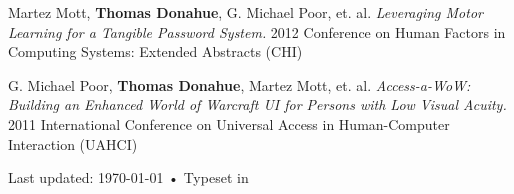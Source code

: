\documentclass[10pt, letter]{article}
\newcommand{\years}[1]{\marginnote{\footnotesize #1}}
\begin{document}
\vspace{.2cm}
\years{2012} 
Martez Mott, \textbf{Thomas Donahue}, G. Michael Poor, et. al.
\textsl{Leveraging Motor Learning for a Tangible Password System.}
2012 Conference on Human Factors in Computing Systems: Extended Abstracts
(CHI)

\vspace{.2cm}
\years{2011} 
G. Michael Poor, \textbf{Thomas Donahue}, Martez Mott, et. al.
\textsl{Access-a-WoW: Building an Enhanced World of Warcraft \uppercase{UI} for Persons with Low Visual Acuity.}
2011 International Conference on Universal Access in Human-Computer Interaction
(UAHCI)



\vspace{0.5cm}
\begin{center}
  {\scriptsize  Last updated: \today\- •\-
    Typeset in \href{http://nitens.org/taraborelli/cvtex}{
      \XeTeX }\\

}
\end{center}
\end{document}
